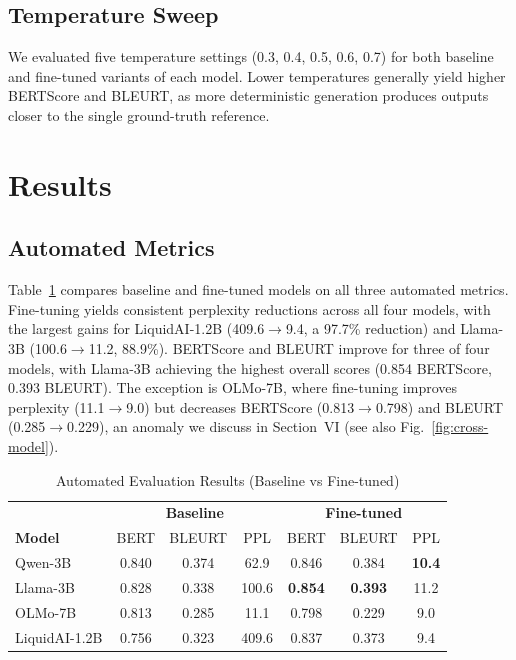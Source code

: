 \documentclass[conference]{IEEEtran}
\begin{document}
\subsection{Temperature Sweep}

We evaluated five temperature settings (0.3, 0.4, 0.5, 0.6, 0.7) for both baseline and fine-tuned variants of each model. Lower temperatures generally yield higher BERTScore and BLEURT, as more deterministic generation produces outputs closer to the single ground-truth reference.

\section{Results}

\subsection{Automated Metrics}

Table~\ref{tab:automated-results} compares baseline and fine-tuned models on all three automated metrics. Fine-tuning yields consistent perplexity reductions across all four models, with the largest gains for LiquidAI-1.2B (409.6$\to$9.4, a 97.7\% reduction) and Llama-3B (100.6$\to$11.2, 88.9\%). BERTScore and BLEURT improve for three of four models, with Llama-3B achieving the highest overall scores (0.854 BERTScore, 0.393 BLEURT). The exception is OLMo-7B, where fine-tuning improves perplexity (11.1$\to$9.0) but decreases BERTScore (0.813$\to$0.798) and BLEURT (0.285$\to$0.229), an anomaly we discuss in Section~VI (see also Fig.~\ref{fig:cross-model}).

\begin{table}[ht]
\centering
\small %
\setlength{\tabcolsep}{3pt} %
\renewcommand{\arraystretch}{1.1} %
\caption{Automated Evaluation Results (Baseline vs Fine-tuned)}
\label{tab:automated-results}
\begin{tabular}{l|ccc|ccc}
\toprule
& \multicolumn{3}{c|}{\textbf{Baseline}} & \multicolumn{3}{c}{\textbf{Fine-tuned}} \\
\textbf{Model} & BERT & BLEURT & PPL & BERT & BLEURT & PPL \\
\midrule
Qwen-3B & 0.840 & 0.374 & 62.9 & 0.846 & 0.384 & \textbf{10.4} \\
Llama-3B & 0.828 & 0.338 & 100.6 & \textbf{0.854} & \textbf{0.393} & 11.2 \\
OLMo-7B & 0.813 & 0.285 & 11.1 & 0.798 & 0.229 & 9.0 \\
LiquidAI-1.2B & 0.756 & 0.323 & 409.6 & 0.837 & 0.373 & 9.4 \\
\bottomrule
\end{tabular}
\end{table}
\end{document}
